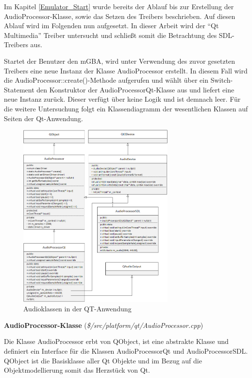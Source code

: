\documentclass[11pt,a4paper]{scrartcl}
\newcommand{\paratitlecode}[2] {
    \vspace{5mm}
    \large \textbf{#1} \normalsize(\textit{\${#2}})
    \vspace{2mm}\newline
}
\begin{document}
Im Kapitel \ref{Emulator_Start} wurde bereits der Ablauf bis zur Erstellung der AudioProcessor-Klasse, sowie das Setzen des Treibers beschrieben. Auf diesen Ablauf wird im Folgenden nun aufgesetzt. In dieser Arbeit
wird der \enquote{Qt Multimedia} Treiber untersucht und schlie{\ss}t somit die Betrachtung des SDL-Treibers aus.

Startet der Benutzer den mGBA, wird unter Verwendung des zuvor gesetzten Treibers eine neue Instanz der Klasse AudioProcessor erstellt. In diesem Fall wird die AudioProcessor::create()-Methode aufgerufen und w\"ahlt \"uber ein Switch-Statement den Konstruktor der AudioProcessorQt-Klasse aus und liefert eine neue Instanz zur\"uck. Dieser verf\"ugt \"uber keine Logik und ist demnach leer. F\"ur die weitere Untersuchung folgt ein Klassendiagramm der wesentlichen Klassen auf Seiten der Qt-Anwendung.

\begin{figure}[h!]
    \centering
    \includegraphics[width=0.7\textwidth]{QT_Klassendiagramm}
    \caption{Audioklassen in der QT-Anwendung}
    \label{fig:qtclassdiagramm}
\end{figure}

\newpage

\paratitlecode{AudioProcessor-Klasse}{/src/platform/qt/AudioProcessor.cpp}
Die Klasse AudioProcessor erbt von QObject, ist eine abstrakte Klasse und definiert ein Interface f\"ur die Klassen AudioProcessorQt und AudioProcessorSDL. QObject ist die Basisklasse aller Qt Objekte und im Bezug auf
die Objektmodellierung somit das Herzst\"uck von Qt. 
\end{document}
